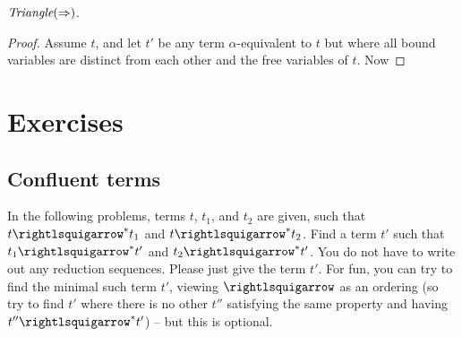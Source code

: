 \begin{theorem}
  $\textit{Triangle}(\Rightarrow)$.
\end{theorem}
\begin{proof}
  Assume $t$, and let $t'$ be any term $\alpha$-equivalent to $t$ but
  where all bound variables are distinct from each other and the free variables
  of $t$.  Now
  \end{proof}

\section{Exercises}

\subsection{Confluent terms}

In the following problems, terms $t$, $t_1$, and $t_2$ are given, such
that $t\betaa^* t_1$ and $t\betaa^* t_2$.  Find a term $t'$ such
that $t_1\betaa^* t'$ and $t_2\betaa^* t'$.  You do not have to
write out any reduction sequences.  Please just give the term $t'$.
For fun, you can try to find the minimal such term $t'$, viewing $\betaa$
as an ordering (so try to find $t'$ where there is no other $t''$
satisfying the same property and having $t''\betaa^* t'$) -- but
this is optional.

